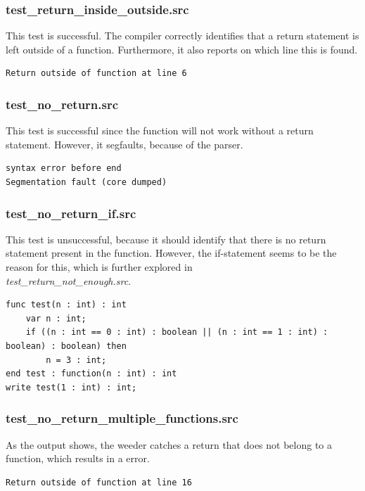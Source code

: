\documentclass[a4paper,10pt,titlepage]{report}
\begin{document}
\subsubsection{test\_return\_inside\_outside.src}
This test is successful. The compiler correctly identifies that a return statement is left outside of a function. Furthermore, it also reports on which line this is found.
\begin{lstlisting}
Return outside of function at line 6
\end{lstlisting}

\subsubsection{test\_no\_return.src}
This test is successful since the function will not work without a return statement. However, it segfaults, because of the parser.
\begin{lstlisting}
syntax error before end
Segmentation fault (core dumped)
\end{lstlisting}

\subsubsection{test\_no\_return\_if.src}
This test is unsuccessful, because it should identify that there is no return statement present in the function. However, the if-statement seems to be the reason for this, which is further explored in\\ \textit{test\_return\_not\_enough.src}.
\begin{lstlisting}
func test(n : int) : int
    var n : int;
    if ((n : int == 0 : int) : boolean || (n : int == 1 : int) : boolean) : boolean) then
        n = 3 : int;
end test : function(n : int) : int
write test(1 : int) : int;
\end{lstlisting}

\subsubsection{test\_no\_return\_multiple\_functions.src}
As the output shows, the weeder catches a return that does not belong to a function, which results in a error.
\begin{lstlisting}
Return outside of function at line 16
\end{lstlisting}
\end{document}
